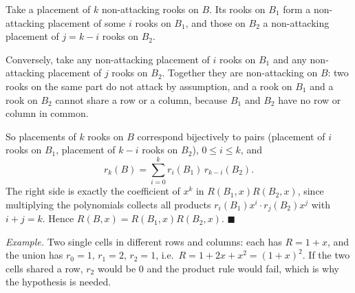 Take a placement of $k$ non-attacking rooks on $B$. Its rooks on $B_1$ form a non-attacking placement of some $i$ rooks on $B_1$, and those on $B_2$ a non-attacking placement of $j=k-i$ rooks on $B_2$.

Conversely, take any non-attacking placement of $i$ rooks on $B_1$ and any non-attacking placement of $j$ rooks on $B_2$. Together they are non-attacking on $B$: two rooks on the same part do not attack by assumption, and a rook on $B_1$ and a rook on $B_2$ cannot share a row or a column, because $B_1$ and $B_2$ have no row or column in common.

So placements of $k$ rooks on $B$ correspond bijectively to pairs (placement of $i$ rooks on $B_1$, placement of $k-i$ rooks on $B_2$), $0\le i\le k$, and
\[
r_k(B)=\sum_{i=0}^{k}r_i(B_1)\,r_{k-i}(B_2).
\]
The right side is exactly the coefficient of $x^k$ in $R(B_1,x)R(B_2,x)$, since multiplying the polynomials collects all products $r_i(B_1)x^i\cdot r_j(B_2)x^j$ with $i+j=k$. Hence $R(B,x)=R(B_1,x)R(B_2,x)$. $\blacksquare$

\emph{Example.} Two single cells in different rows and columns: each has $R=1+x$, and the union has $r_0=1$, $r_1=2$, $r_2=1$, i.e.\ $R=1+2x+x^2=(1+x)^2$. If the two cells shared a row, $r_2$ would be $0$ and the product rule would fail, which is why the hypothesis is needed.
